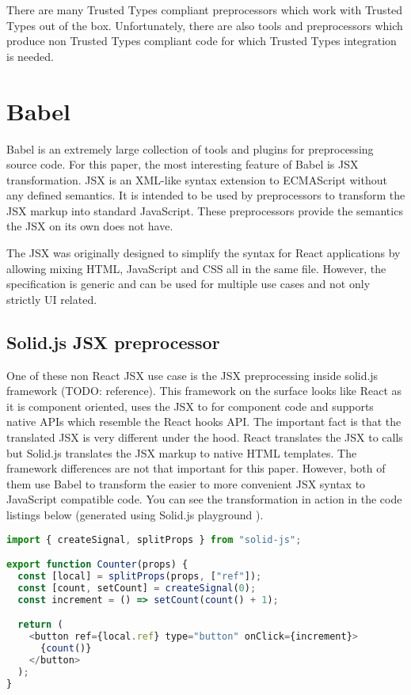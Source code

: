 There are many Trusted Types compliant preprocessors which work with Trusted Types out of the box.
Unfortunately, there are also tools and preprocessors which produce non Trusted Types compliant code
for which Trusted Types integration is needed.

\section{Babel}

Babel is an extremely large collection of tools and plugins for preprocessing source code. For this
paper, the most interesting feature of Babel is JSX transformation. JSX is an XML-like syntax
extension to ECMAScript without any defined semantics. It is intended to be used by preprocessors to
transform the JSX markup into standard JavaScript. These preprocessors provide the semantics the JSX
on its own does not have.

The JSX was originally designed to simplify the syntax for React applications by allowing mixing
HTML, JavaScript and CSS all in the same file. However, the specification \cite{jsx_spec} is
generic and can be used for multiple use cases and not only strictly UI related.

\subsection{Solid.js JSX preprocessor}

One of these non React JSX use case is the JSX preprocessing inside solid.js framework (TODO:
reference). This framework on the surface looks like React as it is component oriented, uses the JSX
to for component code and supports native APIs which resemble the React hooks API. The important
fact is that the translated JSX is very different under the hood. React translates the JSX to
 calls but Solid.js translates the JSX markup to native HTML templates.
The framework differences are not that important for this paper. However, both of them use Babel to
transform the easier to more convenient JSX syntax to JavaScript compatible code. You can see the
transformation in action in the code listings below (generated using Solid.js playground
\cite{solidjs_playground}).

\bigskip
\begin{lstlisting}[language=JavaScript, caption=Example of a component in Solid.js using JSX]
import { createSignal, splitProps } from "solid-js";

export function Counter(props) {
  const [local] = splitProps(props, ["ref"]);
  const [count, setCount] = createSignal(0);
  const increment = () => setCount(count() + 1);

  return (
    <button ref={local.ref} type="button" onClick={increment}>
      {count()}
    </button>
  );
}
\end{lstlisting}

